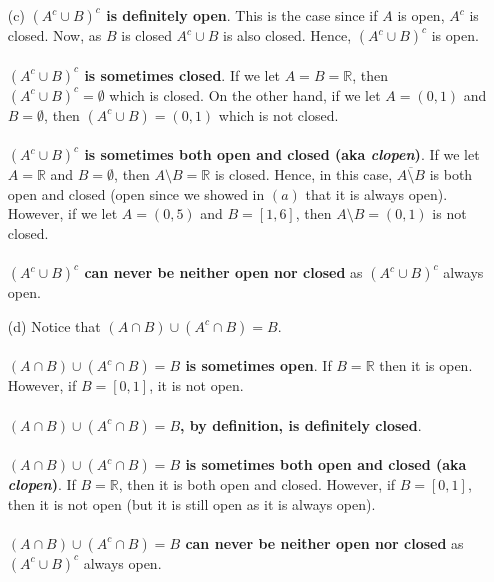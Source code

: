 \documentclass[11pt]{article}
\newcommand{\reals}{\mathbb{R}}
\begin{document}
\begin{itemize}
\begin{itemize}
            \item[(c)]
                \textbf{$(A^c \cup B)^c$ is definitely open}. This is the case
                since if $A$ is open, $A^c$ is closed. Now, as $B$ is closed
                $A^c \cup B$ is also closed. Hence, $(A^c \cup B)^c$ is open.
                \\
                \\
                \textbf{$(A^c \cup B)^c$ is sometimes closed}. If we let $A = B
                = \reals$, then $(A^c \cup B)^c = \emptyset$ which is closed.
                On the other hand, if we let $A = (0, 1)$ and $B = \emptyset$,
                then $(A^c \cup B) = (0, 1)$ which is not closed.
                \\
                \\
                \textbf{$(A^c \cup B)^c$ is sometimes both open and
                closed (aka \textit{clopen})}. If we let $A = \reals$ and $B =
                \emptyset$, then $A \setminus B = \reals$ is closed. Hence, in
                this case, $\overline{A \setminus B}$ is both open and closed
                (open since we showed in $(a)$ that it is always open).
                However, if we let $A = (0, 5)$ and $B = [1, 6]$, then $A
                \setminus B = (0, 1)$ is not closed.
                \\
                \\
                \textbf{$(A^c \cup B)^c$ can never be neither open nor closed}
                as $(A^c \cup B)^c$ always open.

            \item[(d)]
                Notice that $(A \cap B) \cup (A^c \cap B) = B$.
                \\
                \\
                \textbf{$(A \cap B) \cup (A^c \cap B) = B$ is sometimes open}.
                If $B = \reals$ then it is open. However, if $B = [0, 1]$, it
                is not open.
                \\
                \\
                \textbf{$(A \cap B) \cup (A^c \cap B) = B$, by definition, is
                definitely closed}.
                \\
                \\
                \textbf{$(A \cap B) \cup (A^c \cap B) = B$ is sometimes both
                open and closed (aka \textit{clopen})}. If $B = \reals$, then
                it is both open and closed. However, if $B = [0, 1]$, then it
                is not open (but it is still open as it is always open).
                \\
                \\
                \textbf{$(A \cap B) \cup (A^c \cap B) = B$ can never be neither
                open nor closed} as $(A^c \cup B)^c$ always open.


\end{itemize}
\end{itemize}
\end{document}
